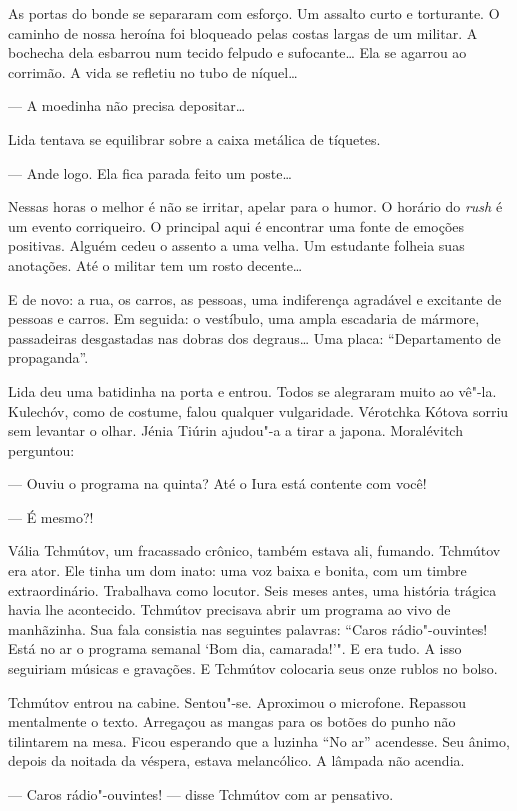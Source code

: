 As portas do bonde se separaram com esforço. Um assalto curto e
torturante. O caminho de nossa heroína foi bloqueado pelas costas largas
de um militar. A bochecha dela esbarrou num tecido felpudo e
sufocante\ldots{} Ela se agarrou ao corrimão. A vida se refletiu no tubo de
níquel\ldots{}

--- A moedinha não precisa depositar\ldots{}

Lida tentava se equilibrar sobre a caixa metálica de tíquetes.

--- Ande logo. Ela fica parada feito um poste\ldots{}

Nessas horas o melhor é não se irritar, apelar para o humor. O horário
do \emph{rush} é um evento corriqueiro. O principal aqui é encontrar uma
fonte de emoções positivas. Alguém cedeu o assento a uma velha. Um
estudante folheia suas anotações. Até o militar tem um rosto decente\ldots{}

E de novo: a rua, os carros, as pessoas, uma indiferença agradável e
excitante de pessoas e carros. Em seguida: o vestíbulo, uma ampla
escadaria de mármore, passadeiras desgastadas nas dobras dos degraus\ldots{}
Uma placa: ``Departamento de propaganda''.

Lida deu uma batidinha na porta e entrou. Todos se alegraram muito ao
vê"-la. Kulechóv, como de costume, falou qualquer vulgaridade. Vérotchka
Kótova sorriu sem levantar o olhar. Jénia Tiúrin ajudou"-a a tirar a
japona. Moralévitch perguntou:

--- Ouviu o programa na quinta? Até o Iura está contente com você!

--- É mesmo?!

Vália Tchmútov, um fracassado crônico, também estava ali, fumando.
Tchmútov era ator. Ele tinha um dom inato: uma voz baixa e bonita, com
um timbre extraordinário. Trabalhava como locutor. Seis meses antes, uma
história trágica havia lhe acontecido. Tchmútov precisava abrir um
programa ao vivo de manhãzinha. Sua fala consistia nas seguintes
palavras: ``Caros rádio"-ouvintes! Está no ar o programa semanal `Bom
dia, camarada!'". E era tudo. A isso seguiriam músicas e
gravações. E Tchmútov colocaria seus onze rublos no bolso.

Tchmútov entrou na cabine. Sentou"-se. Aproximou o microfone. Repassou
mentalmente o texto. Arregaçou as mangas para os botões do punho não
tilintarem na mesa. Ficou esperando que a luzinha ``No ar'' acendesse.
Seu ânimo, depois da noitada da véspera, estava melancólico. A lâmpada
não acendia.

--- Caros rádio"-ouvintes! --- disse Tchmútov com ar pensativo.

